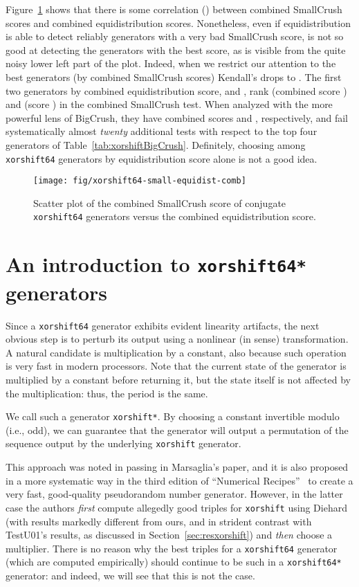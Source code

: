 \documentclass{acmsmalltr}
\newcommand{\xorshift}[1][]{\texttt{xorshift#1}\xspace}
\newcommand{\xorshifts}[1][]{\texttt{xorshift#1*}\xspace}
\begin{document}
Figure~\ref{fig:xorshiftsmallequidistcomb} shows that there is some
correlation () between combined SmallCrush scores and combined equidistribution
scores. Nonetheless, even if equidistribution is able to detect reliably
generators with a very bad SmallCrush score, is not so good at detecting the
generators with the best score, as is visible
from the quite noisy lower left part of the plot.
Indeed, when we restrict our attention
to the best  generators (by combined SmallCrush scores) Kendall's  drops to .
The first two
generators by combined equidistribution score,  and
, rank  (combined score ) and  (score ) in the
combined SmallCrush test. When analyzed with the more powerful lens of BigCrush,
they have combined scores  and , respectively, and fail
systematically almost \emph{twenty} additional tests with respect to the top 
four generators of Table~\ref{tab:xorshiftBigCrush}. Definitely, choosing
among \xorshift[64] generators by equidistribution score alone is not a good idea.

\begin{figure}
\centering
\texttt{[image: fig/xorshift64-small-equidist-comb]}
\caption{\label{fig:xorshiftsmallequidistcomb}Scatter plot of the combined SmallCrush score of conjugate \xorshift[64] generators versus the combined equidistribution score.}
\end{figure}




\section{An introduction to \xorshifts[64] generators}

Since a \xorshift[64] generator exhibits evident linearity artifacts, the next
obvious step is to perturb its output using a nonlinear (in  sense) transformation. A natural candidate is multiplication by a
constant, also because such operation is very fast in modern
processors. Note that the current state of the generator is multiplied by a
constant before returning it, but the state itself is not affected by the
multiplication: thus, the period is the same.

We call such a generator \xorshifts. By choosing a constant invertible modulo
 (i.e., odd), we can guarantee that the generator will output a
permutation of the sequence output by the underlying \xorshift generator.

This approach was noted in passing in Marsaglia's paper, and it is also proposed
in a more systematic way in the third edition of ``Numerical
Recipes''~\cite{PTVNR} to create a very fast, good-quality pseudorandom number
generator. However, in the latter case the authors \emph{first} compute
allegedly good triples for \xorshift using Diehard (with results markedly
different from ours, and in strident contrast with TestU01's results, as
discussed in Section~\ref{sec:resxorshift}) and \emph{then} choose a multiplier.
There is no reason why the best triples for a
\xorshift[64] generator (which are computed empirically) should continue to be
such in a \xorshifts[64] generator: and indeed, we will see that this is not the
case.
\end{document}

